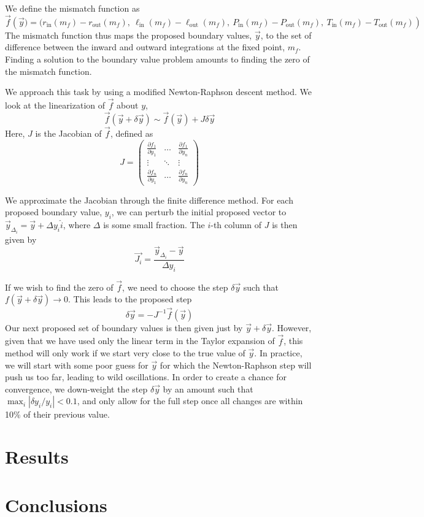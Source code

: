 \documentclass[onecolumn]{article}
\newcommand{\D}[2]{\ensuremath{\frac{\partial #1}{\partial #2}}}
\begin{document}
We define the mismatch function as
\begin{equation}
  \vec{f}\left(\vec{y}) = (r_\text{in}(m_f) - r_\text{out}(m_f), \ \ell_\text{in}(m_f) - \ell_\text{out}(m_f), \  P_\text{in}(m_f) - P_\text{out}(m_f), \ T_\text{in}(m_f) - T_\text{out}(m_f)\right)
\end{equation}
The mismatch function thus maps the proposed boundary values, $\vec{y}$, to the set of difference between the inward and outward integrations at the fixed point, $m_f$.  Finding a solution to the boundary value problem amounts to finding the zero of the mismatch function.

We approach this task by using a modified Newton-Raphson descent method.  We look at the linearization of $\vec{f}$ about $y$,
\begin{equation}
  \vec{f}(\vec{y} + \delta\vec{y}) \sim \vec{f}(\vec{y}) + J \delta\vec{y}
\end{equation}
Here, $J$ is the Jacobian of $\vec{f}$, defined as
\begin{equation}
  J = 
  \begin{pmatrix}
    \D{f_1}{y_1} & \ldots & \D{f_1}{y_n} \\
    \vdots & \ddots & \vdots \\
    \D{f_n}{y_1} & \ldots & \D{f_n}{y_n}
  \end{pmatrix}
\end{equation}

We approximate the Jacobian through the finite difference method.  For each proposed boundary value, $y_i$, we can perturb the initial proposed vector to $\vec{y}_{\Delta_i} = \vec{y} + \Delta y_i \hat{i}$, where $\Delta$ is some small fraction.  The $i$-th column of $J$ is then given by
\begin{equation}
  \vec{J_i} =  \frac{\vec{y}_{\Delta_i} - \vec{y}}{\Delta y_i}
\end{equation}

If we wish to find the zero of $\vec{f}$, we need to choose the step $\delta \vec{y}$ such that $f(\vec{y} + \delta\vec{y}) \rightarrow 0$.  This leads to the proposed step
\begin{equation}
  \delta\vec{y} = -J^{-1}\vec{f}(\vec{y})
\end{equation}
Our next proposed set of boundary values is then given just by $\vec{y} + \delta\vec{y}$.  However, given that we have used only the linear term in the Taylor expansion of $\vec{f}$, this method will only work if we start very close to the true value of $\vec{y}$.  In practice, we will start with some poor guess for $\vec{y}$ for which the Newton-Raphson step will push us too far, leading to wild oscillations.  In order to create a chance for convergence, we down-weight the step $\delta\vec{y}$ by an amount such that $\max_i |\delta y_i / y_i| < 0.1$, and only allow for the full step once all changes are within 10\% of their previous value.

\section{Results}

\section{Conclusions}
\end{document}
